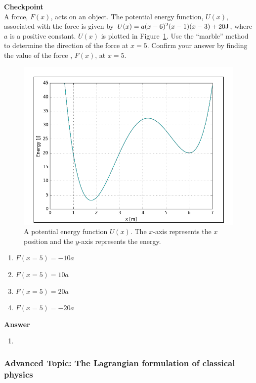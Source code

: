 \begin{framed}
\textbf{Checkpoint}\\
A force, $F(x)$, acts on an object. The potential energy function, $U(x)$, associated with the force is given by $U(x)=a(x -6)^2(x -1)(x -3)+20 {\rm J}$, where $a$ is a positive constant. $U(x)$ is plotted in Figure~\ref{fig:potentialecons:potentialcheckpoint}. Use the ``marble'' method to determine the direction of the force at $x=5$. Confirm your answer by finding the value of the force , $F(x)$, at $x=5$.

\begin{figure}[!htbp]
\centering
\includegraphics[width=0.5\linewidth]{files/potentialcheckpoint-611b04b42e2cece8657bac4b1784030f.png}
\caption[]{A potential energy function $U(x)$. The $x$-axis represents the $x$ position and the $y$-axis represents the energy.}
\label{fig:potentialecons:potentialcheckpoint}
\end{figure}

\begin{enumerate}
\item $F(x=5)= -10a$
\item $F(x=5)=10a$
\item $F(x=5)=20a$
\item $F(x=5)= -20a$
\end{enumerate}

\begin{framed}
\textbf{Answer}\\
\begin{enumerate}[resume]
\item
\end{enumerate}
\end{framed}
\end{framed}

\subsubsection{Advanced Topic: The Lagrangian formulation of classical physics}

